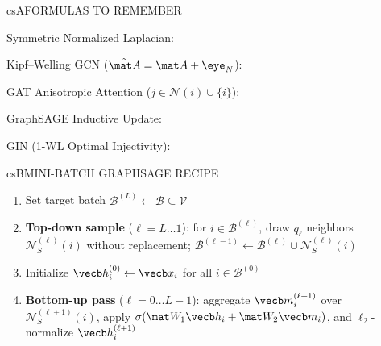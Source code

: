 \documentclass[../../../../master.tex]{subfiles}
\begin{document}

\csnextpage

\begin{cscolumns}
\begin{cscard}{csA}{FORMULAS TO REMEMBER}
  \begin{csbul}
    \item Symmetric Normalized Laplacian:
    \item Kipf--Welling GCN ($\tilde{\mat A}=\mat A+\eye_N$):
    \item GAT Anisotropic Attention ($j\in\mathcal N(i)\cup\{i\}$):
    \item GraphSAGE Inductive Update:
    \item GIN (1-WL Optimal Injectivity):
  \end{csbul}
\end{cscard}

\begin{cscard}{csB}{MINI-BATCH GRAPHSAGE RECIPE}
  \begin{enumerate}[leftmargin=1.2em, itemsep=1pt, topsep=1pt, parsep=0pt]
    \item Set target batch $\mathcal B^{(L)} \leftarrow \mathcal B \subseteq \mathcal V$
    \item \textbf{Top-down sample} ($\ell=L\dots 1$): for $i\in\mathcal B^{(\ell)}$, draw $q_\ell$ neighbors $\mathcal N_S^{(\ell)}(i)$ without replacement; $\mathcal B^{(\ell-1)} \leftarrow \mathcal B^{(\ell)}\cup\mathcal N_S^{(\ell)}(i)$
    \item Initialize $\vecb h_i^{(0)}\leftarrow\vecb x_i$ for all $i\in\mathcal B^{(0)}$
    \item \textbf{Bottom-up pass} ($\ell=0\dots L-1$): aggregate $\vecb m_i^{(\ell+1)}$ over $\mathcal N_S^{(\ell+1)}(i)$, apply $\sigma(\mat W_1\vecb h_i+\mat W_2\vecb m_i)$, and $\ell_2$-normalize $\vecb h_i^{(\ell+1)}$
  \end{enumerate}
\end{cscard}
\columnbreak


\end{cscolumns}
\end{document}
